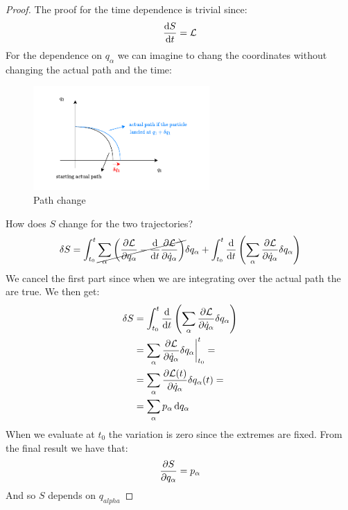 \begin{proof}
  The proof for the time dependence is trivial since:
  \begin{equation}
    \dv{S}{t} = \lagr
  \end{equation}
  For the dependence on $q_{\alpha}$ we can imagine to chang the coordinates without changing the actual path and the time:
  \begin{figure}[H]
    \centering
    \includegraphics[width=0.6\textwidth]{res/svg/path_change_hamjac.drawio}
    \caption{Path change}
\end{figure}
How does $S$ change for the two trajectories?
\begin{equation}
  \delta S = \int_{t_0}^{t}\cancel{\bigsum_{\alpha}\brackets{\pdv{\lagr}{q_{\alpha}}-\dv{}{t}\pdv{\lagr}{\dot{q}_{\alpha}}}}\delta q_{\alpha} + \int_{t_0}^{t} \dv{}{t} \brackets{\bigsum_{\alpha} \pdv{\lagr}{\dot{q}_{\alpha}}\delta q_{\alpha}}
\end{equation}
We cancel the first part since when we are integrating over the actual path the \eleref\;are true. We then get:
\begin{equation}
  \begin{split}
    \delta S &= \int_{t_0}^{t}\dv{}{t}\brackets{\bigsum_{\alpha} \pdv{\lagr}{\dot{q}_{\alpha}}\delta q_{\alpha}}\\
    &= \bigsum_{\alpha} \pdv{\lagr}{\dot{q}_{\alpha}}\delta q_{\alpha}\bigg|_{t_0}^t =\\
    &= \bigsum_{\alpha} \pdv{\lagr(t)}{\dot{q}_{\alpha}}\delta q_{\alpha}(t) =\\
    &= \bigsum_{\alpha} p_{\alpha} \dd{q_{\alpha}}
  \end{split}
\end{equation}
When we evaluate at $t_0$ the variation is zero since the extremes are fixed. From the final result we have that:
\begin{equation}
  \pdv{S}{q_{\alpha}} = p_{\alpha}
\end{equation}
And so $S$ depends on $q_{alpha}$
\end{proof}

